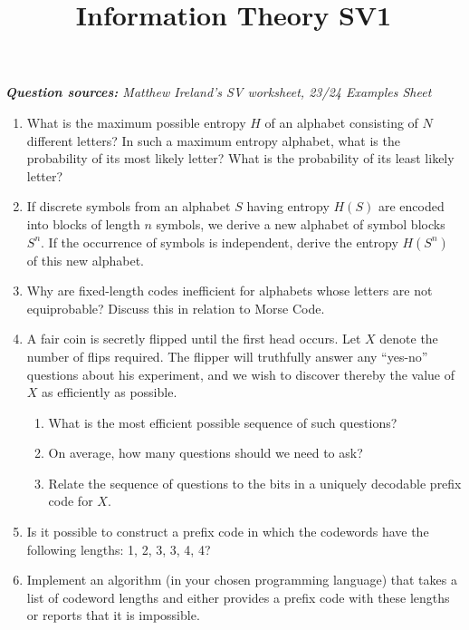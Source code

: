 \documentclass[11pt,a4paper]{article}
\title{Information Theory SV1}
\author{}
\date{}
\begin{document}
\maketitle

\emph{\textbf{Question sources:} Matthew Ireland's SV worksheet, 23/24 Examples Sheet
}



\begin{enumerate}
    \item What is the maximum possible entropy $H$ of an alphabet consisting of $N$ different letters?  
    In such a maximum entropy alphabet, what is the probability of its most likely letter?  
    What is the probability of its least likely letter?

    \item If discrete symbols from an alphabet $S$ having entropy $H(S)$ are encoded into blocks of length $n$ symbols, we derive a new alphabet of symbol blocks $S^n$.  
    If the occurrence of symbols is independent, derive the entropy $H(S^n)$ of this new alphabet.

    \item Why are fixed-length codes inefficient for alphabets whose letters are not equiprobable?  
    Discuss this in relation to Morse Code.

    \item A fair coin is secretly flipped until the first head occurs.  
    Let $X$ denote the number of flips required.  
    The flipper will truthfully answer any “yes-no” questions about his experiment, and we wish to discover thereby the value of $X$ as efficiently as possible.
    \begin{enumerate}
        \item What is the most efficient possible sequence of such questions?
        \item On average, how many questions should we need to ask?
        \item Relate the sequence of questions to the bits in a uniquely decodable prefix code for $X$.
    \end{enumerate}

    \item Is it possible to construct a prefix code in which the codewords have the following lengths: 1, 2, 3, 3, 4, 4?

    \item Implement an algorithm (in your chosen programming language) that takes a list of codeword lengths and either provides a prefix code with these lengths or reports that it is impossible.


\end{enumerate}
\end{document}
